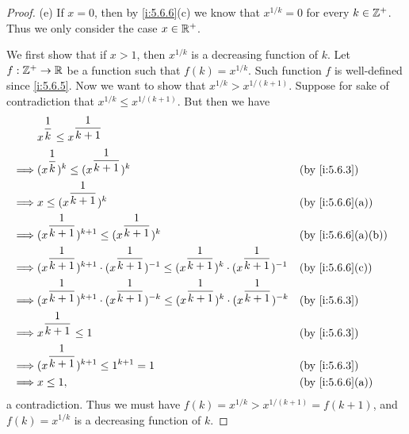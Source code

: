 \begin{proof}{(e)}
  If \(x = 0\), then by \cref{i:5.6.6}(c) we know that \(x^{1 / k} = 0\) for every \(k \in \mathbb{Z}^+\).
  Thus we only consider the case \(x \in \mathbb{R}^+\).

  We first show that if \(x > 1\), then \(x^{1 / k}\) is a decreasing function of \(k\).
  Let \(f : \mathbb{Z}^+ \to \mathbb{R}\) be a function such that \(f(k) = x^{1 / k}\).
  Such function \(f\) is well-defined since \cref{i:5.6.5}.
  Now we want to show that \(x^{1 / k} > x^{1 / (k + 1)}\).
  Suppose for sake of contradiction that \(x^{1 / k} \leq x^{1 / (k + 1)}\).
  But then we have
  \begin{align*}
             & x^{\dfrac{1}{k}} \leq x^{\dfrac{1}{k + 1}}                                                                                                              \\
    \implies & (x^{\dfrac{1}{k}})^k \leq (x^{\dfrac{1}{k + 1}})^k                                                                               &  & \by{i:5.6.3}      \\
    \implies & x \leq (x^{\dfrac{1}{k + 1}})^k                                                                                                  &  & \by{i:5.6.6}[a]   \\
    \implies & (x^{\dfrac{1}{k + 1}})^{k + 1} \leq (x^{\dfrac{1}{k + 1}})^k                                                                     &  & \by{i:5.6.6}[a,b] \\
    \implies & (x^{\dfrac{1}{k + 1}})^{k + 1} \cdot (x^{\dfrac{1}{k + 1}})^{-1} \leq (x^{\dfrac{1}{k + 1}})^k \cdot (x^{\dfrac{1}{k + 1}})^{-1} &  & \by{i:5.6.6}[c]   \\
    \implies & (x^{\dfrac{1}{k + 1}})^{k + 1} \cdot (x^{\dfrac{1}{k + 1}})^{-k} \leq (x^{\dfrac{1}{k + 1}})^k \cdot (x^{\dfrac{1}{k + 1}})^{-k} &  & \by{i:5.6.3}      \\
    \implies & x^{\dfrac{1}{k + 1}} \leq 1                                                                                                      &  & \by{i:5.6.3}      \\
    \implies & (x^{\dfrac{1}{k + 1}})^{k + 1} \leq 1^{k + 1} = 1                                                                                &  & \by{i:5.6.3}      \\
    \implies & x \leq 1,                                                                                                                        &  & \by{i:5.6.6}[a]
  \end{align*}
  a contradiction.
  Thus we must have \(f(k) = x^{1 / k} > x^{1 / (k + 1)} = f(k + 1)\), and \(f(k) = x^{1 / k}\) is a decreasing function of \(k\).


\end{proof}
